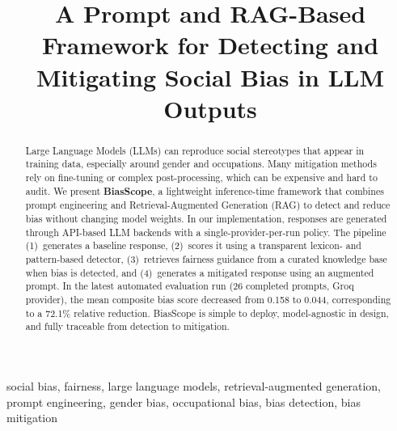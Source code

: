 \documentclass[conference]{IEEEtran}
\begin{document}
\title{A Prompt and RAG-Based Framework for Detecting and Mitigating Social Bias in LLM Outputs}

\author{
  \and
  \and
}

\maketitle

\begin{abstract}
Large Language Models (LLMs) can reproduce social stereotypes that appear in training data, especially around gender and occupations. Many mitigation methods rely on fine-tuning or complex post-processing, which can be expensive and hard to audit. We present \textbf{BiasScope}, a lightweight inference-time framework that combines prompt engineering and Retrieval-Augmented Generation (RAG) to detect and reduce bias without changing model weights. In our implementation, responses are generated through API-based LLM backends with a single-provider-per-run policy. The pipeline (1)~generates a baseline response, (2)~scores it using a transparent lexicon- and pattern-based detector, (3)~retrieves fairness guidance from a curated knowledge base when bias is detected, and (4)~generates a mitigated response using an augmented prompt. In the latest automated evaluation run (26 completed prompts, Groq provider), the mean composite bias score decreased from 0.158 to 0.044, corresponding to a 72.1\% relative reduction. BiasScope is simple to deploy, model-agnostic in design, and fully traceable from detection to mitigation.
\end{abstract}

\begin{IEEEkeywords}
social bias, fairness, large language models, retrieval-augmented generation, prompt engineering, gender bias, occupational bias, bias detection, bias mitigation
\end{IEEEkeywords}
\end{document}
